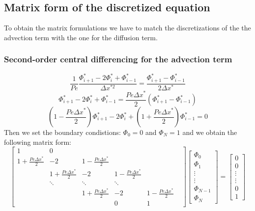 \documentclass{article}
\begin{document}
\subsection{Matrix form of the discretized equation}
To obtain the matrix formulations we have to match the discretizations of the the advection term with the one for the diffusion term.
\subsubsection*{Second-order central differencing for the advection term}
\begin{equation}
    \frac{1}{Pe} \frac{\Phi^*_{i+1} - 2 \Phi^*_i + \Phi^*_{i-1}}{\Delta x^{*2}} = \frac{\Phi^*_{i+1} - \Phi^*_{i-1}}{2 \Delta x^*}
\end{equation}
\[
    \Phi^*_{i+1} - 2 \Phi^*_i + \Phi^*_{i-1} = \frac{Pe \Delta x^*}{2} (\Phi^*_{i+1} - \Phi^*_{i-1})
\]
\[
    (1 - \frac{Pe \Delta x^*}{2}) \Phi^*_{i+1} - 2 \Phi^*_i + (1 + \frac{Pe \Delta x^*}{2}) \Phi^*_{i-1} = 0
\]
Then we set the boundary condistions: $\Phi_0 = 0$ and $\Phi_N = 1$ and we obtain the following matrix form:
\begin{equation}
    \begin{bmatrix}
        1 & 0 &  &  &  \\
        1 + \frac{Pe \Delta x^*}{2} & -2 & 1 - \frac{Pe \Delta x^*}{2} &  &  \\
        & 1 + \frac{Pe \Delta x^*}{2} & -2 & 1 - \frac{Pe \Delta x^*}{2} &  &  \\
            &   \ddots & \ddots & \ddots & \\
        &  &  1 + \frac{Pe \Delta x^*}{2} & -2 & 1 - \frac{Pe \Delta x^*}{2} \\
        &  & & 0 & 1
    \end{bmatrix}
    \begin{bmatrix}
        \Phi_0 \\
        \Phi_1 \\
        \vdots \\
        \vdots \\
        \Phi_{N-1} \\
        \Phi_N
    \end{bmatrix}
    = 
    \begin{bmatrix}
        0 \\
        0 \\
        \vdots \\
        \vdots \\
        0 \\
        1
    \end{bmatrix}
\end{equation}
\end{document}
